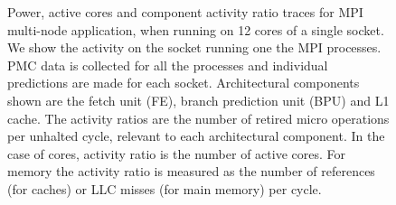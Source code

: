 \begin{figure}[p]
\begin{subfigure}[b]{.48\textwidth}
	\end{subfigure}%
	\caption{Power, active cores and component activity ratio traces for MPI multi-node application, when running on 12 cores of a single socket. We show the activity on the socket running one the MPI processes.  PMC data is collected for all the processes and individual predictions are made for each socket.
 Architectural components shown are the fetch unit (FE), branch prediction unit (BPU)
					and L1 cache.  The activity ratios are the number of retired micro operations per unhalted cycle, relevant to each architectural component.
					In the case of cores, activity ratio is the number of active cores.  For memory the activity ratio is measured as the number of references (for caches) or LLC misses (for main memory) per cycle.} 
	\label{fig:component_activity_ratios_multi_node}
	\vspace{.5cm}
\end{figure}



